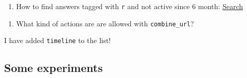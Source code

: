 \documentclass[]{book}
\providecommand{\tightlist}{%
  \setlength{\itemsep}{0pt}\setlength{\parskip}{0pt}}
\theoremstyle{definition}
\theoremstyle{definition}
\theoremstyle{definition}
\theoremstyle{remark}
\begin{document}
\begin{enumerate}
\def\labelenumi{\arabic{enumi}.}
\tightlist
\item
  How to find answers tagged with \texttt{r} and not active since 6
  month:
  \href{https://stackoverflow.com/search?q=\%5Br\%5D+lastactive\%3A..6m+is\%3Aa}{Search}
\end{enumerate}

\begin{enumerate}
\def\labelenumi{\arabic{enumi}.}
\setcounter{enumi}{2}
\tightlist
\item
  What kind of actions are are allowed with \texttt{combine\_url}?
\end{enumerate}

I have added \texttt{timeline} to the list!

\subsection{Some experiments}\label{some-experiments}


\end{document}
